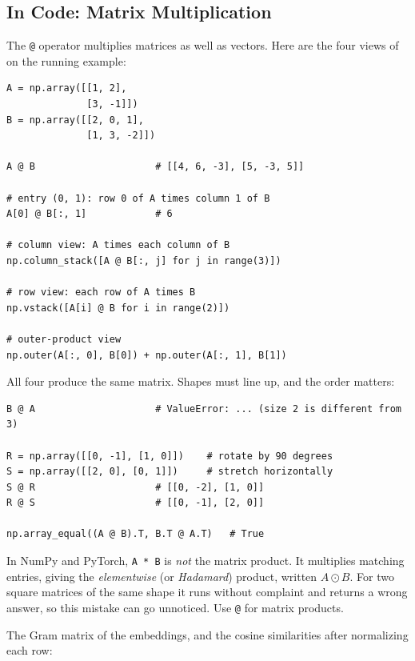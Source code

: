 \subsection{In Code: Matrix Multiplication}
\label{sec:ch03-matmul-code}

The \texttt{@} operator multiplies matrices as well as vectors. Here are
the four views of  on the running example:

\begin{lstlisting}
A = np.array([[1, 2],
              [3, -1]])
B = np.array([[2, 0, 1],
              [1, 3, -2]])

A @ B                     # [[4, 6, -3], [5, -3, 5]]

# entry (0, 1): row 0 of A times column 1 of B
A[0] @ B[:, 1]            # 6

# column view: A times each column of B
np.column_stack([A @ B[:, j] for j in range(3)])

# row view: each row of A times B
np.vstack([A[i] @ B for i in range(2)])

# outer-product view
np.outer(A[:, 0], B[0]) + np.outer(A[:, 1], B[1])
\end{lstlisting}

All four produce the same matrix. Shapes must line up, and the order
matters:

\begin{lstlisting}
B @ A                     # ValueError: ... (size 2 is different from 3)

R = np.array([[0, -1], [1, 0]])    # rotate by 90 degrees
S = np.array([[2, 0], [0, 1]])     # stretch horizontally
S @ R                     # [[0, -2], [1, 0]]
R @ S                     # [[0, -1], [2, 0]]

np.array_equal((A @ B).T, B.T @ A.T)   # True
\end{lstlisting}

\begin{warning}
  In NumPy and PyTorch, \texttt{A * B} is \emph{not} the matrix product. It
  multiplies matching entries, giving the \emph{elementwise} (or
  \emph{Hadamard}) product, written $A \odot B$. For two square matrices of
  the same shape it runs without complaint and returns a wrong answer, so
  this mistake can go unnoticed. Use \texttt{@} for matrix products.
\end{warning}

The Gram matrix of the embeddings, and the cosine similarities after
normalizing each row:

